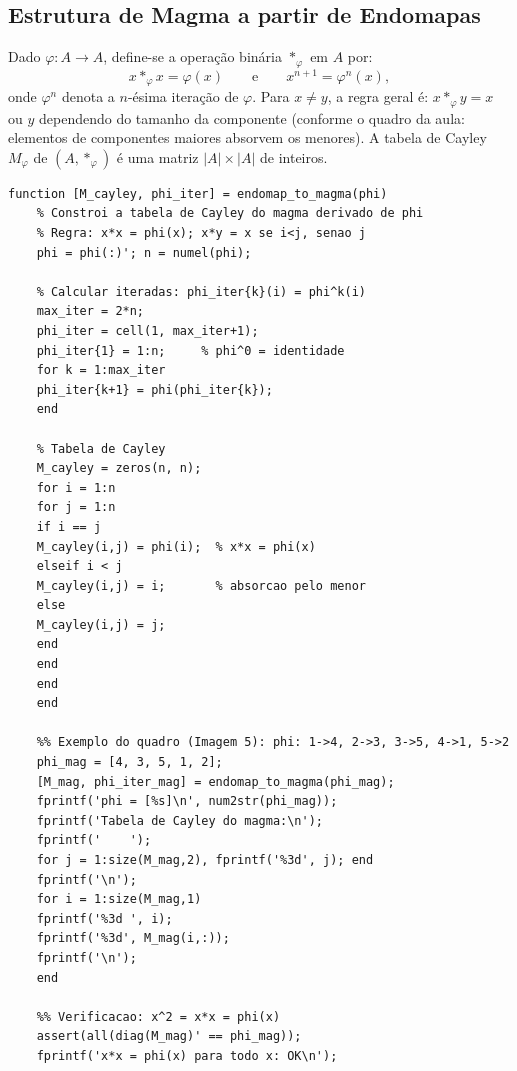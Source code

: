 \subsection{Estrutura de Magma a partir de Endomapas}

\begin{definition}
	Dado $\varphi: A \to A$, define-se a operação binária
	$*_\varphi$ em $A$ por:
	\begin{equation}
		x *_\varphi x = \varphi(x)
		\qquad\text{e}\qquad
		x^{n+1} = \varphi^n(x),
		\label{eq:magma_endo}
	\end{equation}
	onde $\varphi^n$ denota a $n$-ésima iteração de $\varphi$.
	Para $x \neq y$, a regra geral é:
	$x *_\varphi y = x$ ou $y$ dependendo do tamanho da componente
	(conforme o quadro da aula: elementos de componentes maiores
	absorvem os menores).
	A tabela de Cayley $M_\varphi$ de $(A, *_\varphi)$ é uma
	matriz $|A| \times |A|$ de inteiros.
\end{definition}

\begin{lstlisting}[style=matlab, caption={Construção da tabela de Cayley do magma de um endomapa}]
	function [M_cayley, phi_iter] = endomap_to_magma(phi)
	% Constroi a tabela de Cayley do magma derivado de phi
	% Regra: x*x = phi(x); x*y = x se i<j, senao j
	phi = phi(:)'; n = numel(phi);
	
	% Calcular iteradas: phi_iter{k}(i) = phi^k(i)
	max_iter = 2*n;
	phi_iter = cell(1, max_iter+1);
	phi_iter{1} = 1:n;     % phi^0 = identidade
	for k = 1:max_iter
	phi_iter{k+1} = phi(phi_iter{k});
	end
	
	% Tabela de Cayley
	M_cayley = zeros(n, n);
	for i = 1:n
	for j = 1:n
	if i == j
	M_cayley(i,j) = phi(i);  % x*x = phi(x)
	elseif i < j
	M_cayley(i,j) = i;       % absorcao pelo menor
	else
	M_cayley(i,j) = j;
	end
	end
	end
	end
	
	%% Exemplo do quadro (Imagem 5): phi: 1->4, 2->3, 3->5, 4->1, 5->2
	phi_mag = [4, 3, 5, 1, 2];
	[M_mag, phi_iter_mag] = endomap_to_magma(phi_mag);
	fprintf('phi = [%s]\n', num2str(phi_mag));
	fprintf('Tabela de Cayley do magma:\n');
	fprintf('    ');
	for j = 1:size(M_mag,2), fprintf('%3d', j); end
	fprintf('\n');
	for i = 1:size(M_mag,1)
	fprintf('%3d ', i);
	fprintf('%3d', M_mag(i,:));
	fprintf('\n');
	end
	
	%% Verificacao: x^2 = x*x = phi(x)
	assert(all(diag(M_mag)' == phi_mag));
	fprintf('x*x = phi(x) para todo x: OK\n');
\end{lstlisting}

